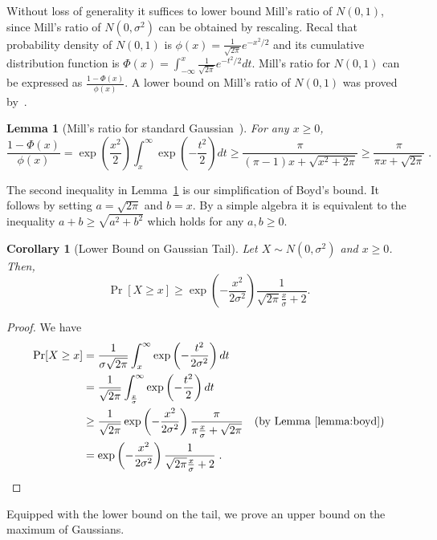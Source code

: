 \documentclass{article}
\newtheorem{lemma}[theorem]{Lemma}
\newtheorem{corollary}[theorem]{Corollary}
\begin{document}
Without loss of generality it suffices to lower bound Mill's ratio of $N(0,1)$,
since Mill's ratio of $N(0,\sigma^2)$ can be obtained by rescaling.  Recal that
probability density of $N(0,1)$ is $\phi(x) = \frac{1}{\sqrt{2 \pi}}
e^{-x^2/2}$ and its cumulative distribution function is $\Phi(x) =
\int_{-\infty}^x \frac{1}{\sqrt{2 \pi}} e^{-t^2/2} dt$.  Mill's ratio for
$N(0,1)$ can be expressed as $\frac{1 - \Phi(x)}{\phi(x)}$. A lower bound on
Mill's ratio of $N(0,1)$ was proved by~\cite{Boyd-1959}.

\begin{lemma}[Mill's ratio for standard Gaussian~\citep{Boyd-1959}]
\label{lemma:boyd}
For any $x \ge 0$,
$$
\frac{1 - \Phi(x)}{\phi(x)}
= \exp\left(\frac{x^2}{2}\right) \int_x^{\infty} \exp\left(-\frac{t^2}{2}\right) dt
\ge \frac{\pi}{(\pi-1)x+\sqrt{x^2+2 \pi}}
\ge \frac{\pi}{\pi x + \sqrt{2\pi}} \; .
$$
\end{lemma}
The second inequality in Lemma~\ref{lemma:boyd} is our simplification of Boyd's
bound.  It follows by setting $a=\sqrt{2 \pi}$ and $b=x$. By a simple algebra
it is equivalent to the inequality $a + b \ge \sqrt{a^2 + b^2}$ which holds for
any $a,b \ge 0$.

\begin{corollary}[Lower Bound on Gaussian Tail]
Let $X \sim N(0, \sigma^2)$ and $x \ge 0$. Then,
$$
\Pr[X \ge x] \ge \exp\left(-\frac{x^2}{2 \sigma^2}\right) \frac{1}{\sqrt{2\pi}\frac{x}{\sigma}+2}.
$$
\end{corollary}

\begin{proof}
We have
\begin{align*}
\Pr[X \ge x]
& = \frac{1}{\sigma \sqrt{2 \pi}} \int_x^{\infty} \exp \left( -\frac{t^2}{2 \sigma^2} \right) d t \\
& = \frac{1}{\sqrt{2 \pi}} \int_\frac{x}{\sigma}^{\infty} \exp \left( -\frac{t^2}{2} \right) d t \\
& \ge \frac{1}{\sqrt{2 \pi}} \exp\left(-\frac{x^2}{2 \sigma^2}\right) \frac{\pi}{\pi\frac{x}{\sigma}+\sqrt{2 \pi}} & \text{(by Lemma~\ref{lemma:boyd})} \\
& = \exp\left(-\frac{x^2}{2 \sigma^2}\right) \frac{1}{\sqrt{2\pi}\frac{x}{\sigma}+2} \; .
\end{align*}
\end{proof}

Equipped with the lower bound on the tail, we prove an upper bound on the maximum of Gaussians.
\end{document}
